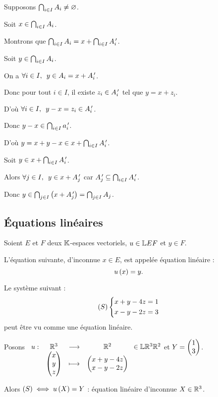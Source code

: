 \begin{dem}
Supposons \(\bigcap_{i\in I}A_i\not=\varnothing\).

Soit \(x\in\bigcap_{i\in I}A_i\).

Montrons que \(\bigcap_{i\in I}A_i=x+\bigcap_{i\in I}A_i^{\,\prime}\).

\incdir

Soit \(y\in\bigcap_{i\in I}A_i\).

On a \(\quantifs{\forall i\in I}y\in A_i=x+A_i\prim\).

Donc pour tout \(i\in I\), il existe \(z_i\in A_i^{\,\prime}\) tel que \(y=x+z_i\).

D'où \(\quantifs{\forall i\in I}y-x=z_i\in A_i\prim\).

Donc \(y-x\in\bigcap_{i\in I}a_i^{\,\prime}\).

D'où \(y=x+y-x\in x+\bigcap_{i\in I}A_i^{\,\prime}\).

\increc

Soit \(y\in x+\bigcap_{i\in I}A_i^{\,\prime}\).

Alors \(\quantifs{\forall j\in I}y\in x+A_j\prim\) car \(A_j^{\,\prime}\subseteq\bigcap_{i\in I}A_i^{\,\prime}\).

Donc \(y\in\bigcap_{j\in I}\left(x+A_j^{\,\prime}\right)=\bigcap_{j\in I}A_j\).
\end{dem}

\subsection{Équations linéaires}

\begin{defi}
Soient \(E\) et \(F\) deux \(\mathbb{K}\)-espaces vectoriels, \(u\in\mathbb{L}{E}{F}\) et \(y\in F\).

L'équation suivante, d'inconnue \(x\in E\), est appelée équation linéaire : \[u\left(x\right)=y.\]
\end{defi}

\begin{ex}
Le système suivant : \[\left(S\right)\begin{dcases}
x+y-4z=1 \\
x-y-2z=3
\end{dcases}\] peut être vu comme une équation linéaire.

Posons \(\begin{array}[t]{cccc}u : & \mathbb{R}^3 & \longrightarrow & \mathbb{R}^2 \\ & \begin{pmatrix}x\\y\\z\end{pmatrix} & \longmapsto & \begin{pmatrix}x+y-4z\\x-y-2z\end{pmatrix}\end{array}\in\mathbb{L}{\mathbb{R}^3}{\mathbb{R}^2}\) et \(Y=\begin{pmatrix}1\\3\end{pmatrix}\).

Alors \(\left(S\right)\iff u\left(X\right)=Y\) : équation linéaire d'inconnue \(X\in\mathbb{R}^3\).
\end{ex}

